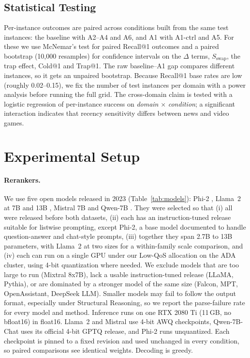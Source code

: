 \documentclass[11pt]{article}
\begin{document}
\subsection{Statistical Testing}
Per-instance outcomes are paired across conditions built from the same test instances: the baseline with A2--A4 and A6, and A1 with A1-ctrl and A5. For these we use McNemar's test for paired Recall@1 outcomes and a paired bootstrap (10{,}000 resamples) for confidence intervals on the $\Delta$ terms, $S_{\text{swap}}$, the trap effect, Cold@1 and Trap@1. The raw baseline--A1 gap compares different instances, so it gets an unpaired bootstrap. Because Recall@1 base rates are low (roughly 0.02--0.15), we fix the number of test instances per domain with a power analysis before running the full grid. The cross-domain claim is tested with a logistic regression of per-instance success on \emph{domain} $\times$ \emph{condition}; a significant interaction indicates that recency sensitivity differs between news and video games.

\section{Experimental Setup}

\paragraph{Rerankers.}\label{sec:models} We use five open models released in 2023 (Table~\ref{tab:models}): Phi-2 \citep{javaheripi2023phi2}, Llama~2 at 7B and 13B \citep{touvron2023llama2}, Mistral 7B \citep{jiang2023mistral} and Qwen-7B \citep{bai2023qwen}. They were selected so that (i) all were released before both datasets, (ii) each has an instruction-tuned release suitable for listwise prompting, except Phi-2, a base model documented to handle question-answer and chat-style prompts, (iii) together they span 2.7B to 13B parameters, with Llama~2 at two sizes for a within-family scale comparison, and (iv) each can run on a single GPU under our Low-QoS allocation on the ADA cluster, using 4-bit quantization where needed. We exclude models that are too large to run (Mixtral 8x7B), lack a usable instruction-tuned release (LLaMA, Pythia), or are dominated by a stronger model of the same size (Falcon, MPT, OpenAssistant, DeepSeek LLM). Smaller models may fail to follow the output format, especially under Structural Reasoning, so we report the parse-failure rate for every model and method. Inference runs on one RTX 2080 Ti (11\,GB, no bfloat16) in float16. Llama~2 and Mistral use 4-bit AWQ checkpoints, Qwen-7B-Chat uses its official 4-bit GPTQ release, and Phi-2 runs unquantized. Each checkpoint is pinned to a fixed revision and used unchanged in every condition, so paired comparisons see identical weights. Decoding is greedy.
\end{document}
